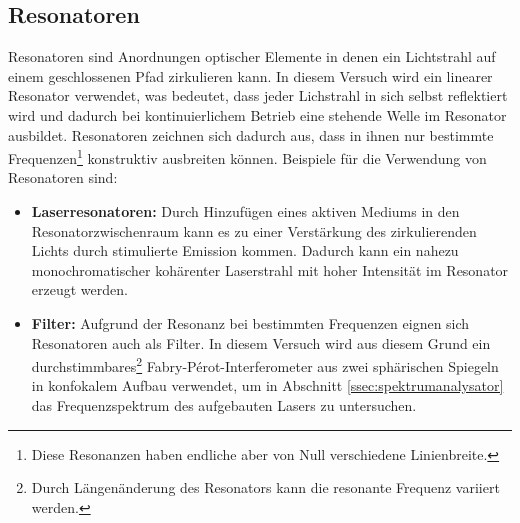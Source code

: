\documentclass[11pt, a4paper]{article}
\numberwithin{equation}{section}
\begin{document}
\subsection{Resonatoren}
Resonatoren sind Anordnungen optischer Elemente in denen ein Lichtstrahl auf einem geschlossenen Pfad zirkulieren kann.
In diesem Versuch wird ein linearer Resonator verwendet, was bedeutet, dass jeder Lichstrahl in sich selbst reflektiert wird und dadurch bei kontinuierlichem Betrieb eine stehende Welle im Resonator ausbildet.
Resonatoren zeichnen sich dadurch aus, dass in ihnen nur bestimmte Frequenzen\footnote{Diese Resonanzen haben endliche aber von Null verschiedene Linienbreite.} konstruktiv ausbreiten können.
Beispiele für die Verwendung von Resonatoren sind:
\begin{itemize}
	\item \textbf{Laserresonatoren:} Durch Hinzufügen eines aktiven Mediums in den Resonatorzwischenraum kann es zu einer Verstärkung des zirkulierenden Lichts durch stimulierte Emission kommen.
	Dadurch kann ein nahezu monochromatischer kohärenter Laserstrahl mit hoher Intensität im Resonator erzeugt werden.	
	
	\item \textbf{Filter:} Aufgrund der Resonanz bei bestimmten Frequenzen eignen sich Resonatoren auch als Filter.
	In diesem Versuch wird aus diesem Grund ein durchstimmbares\footnote{Durch Längenänderung des Resonators kann die resonante Frequenz variiert werden.} Fabry-Pérot-Interferometer aus zwei sphärischen Spiegeln in konfokalem Aufbau verwendet, um in Abschnitt \ref{ssec:spektrumanalysator} das Frequenzspektrum des aufgebauten Lasers zu untersuchen.
\end{itemize}
\end{document}
